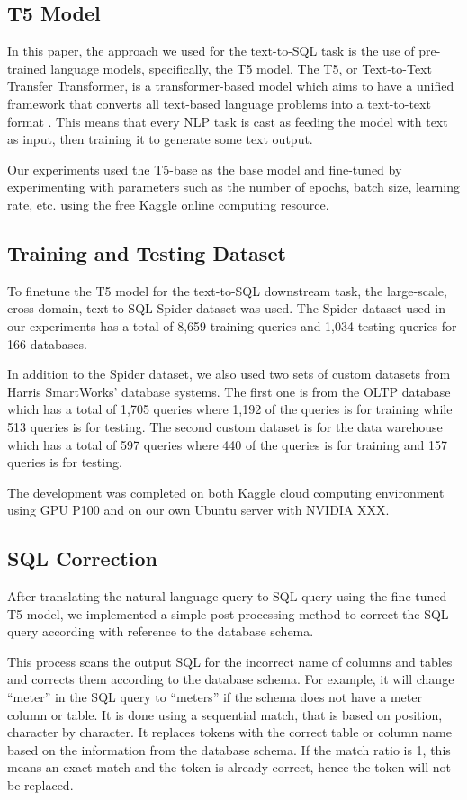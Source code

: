 \documentclass[conference]{IEEEtran}
\begin{document}
\subsection{T5 Model}
In this paper, the approach we used for the text-to-SQL task is the use of pre-trained language models, specifically, the T5 model. The T5, or Text-to-Text Transfer Transformer, is a transformer-based model which aims to have a unified framework that converts all text-based language problems into a text-to-text format \cite{Raffel2019ExploringTransformer}. This means that every NLP task is cast as feeding the model with text as input, then training it to generate some text output. 

Our experiments used the T5-base as the base model and fine-tuned by experimenting with parameters such as the number of epochs, batch size, learning rate, etc. using the free Kaggle online computing resource. 

\subsection{Training and Testing Dataset}
To finetune the T5 model for the text-to-SQL downstream task, the large-scale, cross-domain, text-to-SQL Spider \cite{Yu2018Spider:Task} dataset was used. The Spider dataset used in our experiments has a total of 8,659 training queries and 1,034 testing queries for 166 databases.

In addition to the Spider dataset, we also used two sets of custom datasets from Harris SmartWorks’ database systems. The first one is from the OLTP database which has a total of 1,705 queries where 1,192 of the queries is for training while 513 queries is for testing. The second custom dataset is for the data warehouse which has a total of 597 queries where 440 of the queries is for training and 157 queries is for testing.  

The development was completed on both Kaggle cloud computing environment using GPU P100 and on our own Ubuntu server with NVIDIA XXX.

\subsection{SQL Correction}
After translating the natural language query to SQL query using the fine-tuned T5 model, we implemented a simple post-processing method to correct the SQL query according with reference to the database schema. 

This process scans the output SQL for the incorrect name of columns and tables and corrects them according to the database schema. For example, it will change “meter” in the SQL query to “meters” if the schema does not have a meter column or table. It is done using a sequential match, that is based on position, character by character. It replaces tokens with the correct table or column name based on the information from the database schema. If the match ratio is 1, this means an exact match and the token is already correct, hence the token will not be replaced.
\end{document}

